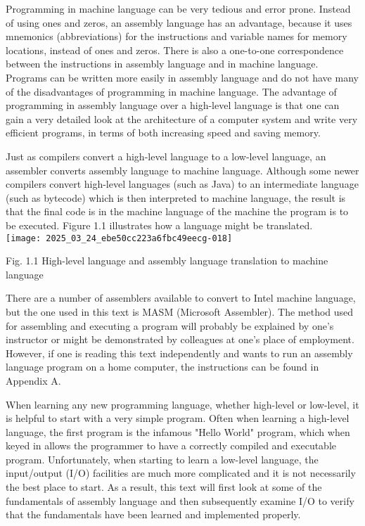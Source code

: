 \documentclass[10pt]{article}
\begin{document}
Programming in machine language can be very tedious and error prone. Instead of using ones and zeros, an assembly language has an advantage, because it uses mnemonics (abbreviations) for the instructions and variable names for memory locations, instead of ones and zeros. There is also a one-to-one correspondence between the instructions in assembly language and in machine language. Programs can be written more easily in assembly language and do not have many of the disadvantages of programming in machine language. The advantage of programming in assembly language over a high-level language is that one can gain a very detailed look at the architecture of a computer system and write very efficient programs, in terms of both increasing speed and saving memory.

Just as compilers convert a high-level language to a low-level language, an assembler converts assembly language to machine language. Although some newer compilers convert high-level languages (such as Java) to an intermediate language (such as bytecode) which is then interpreted to machine language, the result is that the final code is in the machine language of the machine the program is to be executed. Figure 1.1 illustrates how a language might be translated.\\
\texttt{[image: 2025\_03\_24\_ebe50cc223a6fbc49eecg-018]}

Fig. 1.1 High-level language and assembly language translation to machine language

There are a number of assemblers available to convert to Intel machine language, but the one used in this text is MASM (Microsoft Assembler). The method used for assembling and executing a program will probably be explained by one's instructor or might be demonstrated by colleagues at one's place of employment. However, if one is reading this text independently and wants to run an assembly language program on a home computer, the instructions can be found in Appendix A.

When learning any new programming language, whether high-level or low-level, it is helpful to start with a very simple program. Often when learning a high-level language, the first program is the infamous "Hello World" program, which when keyed in allows the programmer to have a correctly compiled and executable program. Unfortunately, when starting to learn a low-level language, the input/output (I/O) facilities are much more complicated and it is not necessarily the best place to start. As a result, this text will first look at some of the fundamentals of assembly language and then subsequently examine I/O to verify that the fundamentals have been learned and implemented properly.
\end{document}
